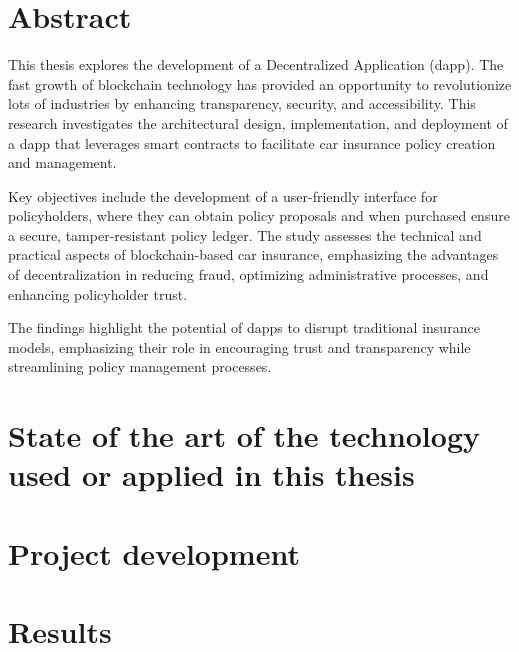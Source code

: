 \documentclass[a4paper,12pt]{article}
\begin{document}
\printglossary[type=\acronymtype]

\newpage


\clearpage
\newpage
\section*{Abstract}

{This thesis explores the development of a Decentralized Application (dapp). The fast growth of blockchain technology has provided an opportunity to revolutionize lots of industries by enhancing transparency, security, and accessibility. This research investigates the architectural design, implementation, and deployment of a dapp that leverages smart contracts to facilitate car insurance policy creation and management.

Key objectives include the development of a user-friendly interface for policyholders, where they can obtain policy proposals and when purchased ensure a secure, tamper-resistant policy ledger. The study assesses the technical and practical aspects of blockchain-based car insurance, emphasizing the advantages of decentralization in reducing fraud, optimizing administrative processes, and enhancing policyholder trust.

The findings highlight the potential of dapps to disrupt traditional insurance models, emphasizing their role in encouraging trust and transparency while streamlining policy management processes.}



\clearpage\section{State of the art of the technology used or applied in this thesis}
  

\bigskip



\clearpage\section{Project development }


\clearpage\section{Results}

\end{document}
